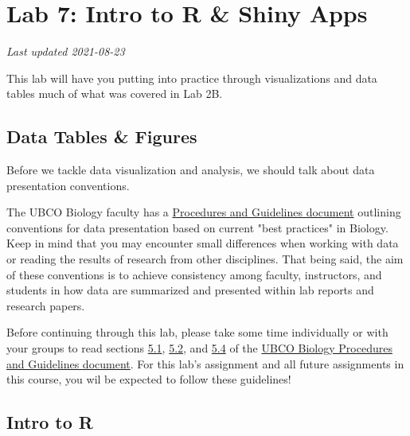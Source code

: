 \documentclass[
]{book}
\begin{document}
\hypertarget{lab-7-intro-to-r-shiny-apps}{%
\chapter*{Lab 7: Intro to R \& Shiny Apps}\label{lab-7-intro-to-r-shiny-apps}}

\emph{Last updated 2021-08-23}

This lab will have you putting into practice through visualizations and data tables much of what was covered in Lab 2B.

\hypertarget{data-tables-figures}{%
\section*{Data Tables \& Figures}\label{data-tables-figures}}

Before we tackle data visualization and analysis, we should talk about data presentation conventions.

The UBCO Biology faculty has a \href{https://ubco-biology.github.io/Procedures-and-Guidelines/figures-tables.html}{Procedures and Guidelines document} outlining conventions for data presentation based on current "best practices" in Biology. Keep in mind that you may encounter small differences when working with data or reading the results of research from other disciplines. That being said, the aim of these conventions is to achieve consistency among faculty, instructors, and students in how data are summarized and presented within lab reports and research papers.

Before continuing through this lab, please take some time individually or with your groups to read sections \href{https://ubco-biology.github.io/Procedures-and-Guidelines/tables.html}{5.1}, \href{https://ubco-biology.github.io/Procedures-and-Guidelines/descriptive-summary-statistics.html}{5.2}, and \href{https://ubco-biology.github.io/Procedures-and-Guidelines/figures.html}{5.4} of the \href{https://ubco-biology.github.io/Procedures-and-Guidelines/figures-tables.html}{UBCO Biology Procedures and Guidelines document}. For this lab's assignment and all future assignments in this course, you wil be expected to follow these guidelines!

\hypertarget{intro-to-r}{%
\section*{Intro to R}\label{intro-to-r}}
\end{document}
